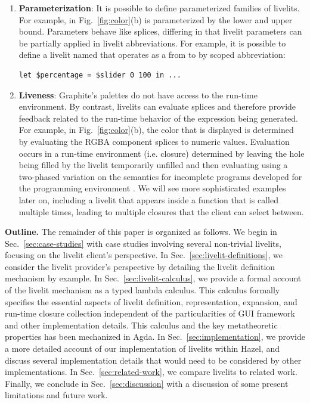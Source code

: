 \begin{enumerate}
  \item \textbf{Parameterization}: It is possible to define parameterized families of livelits.
  For example,  in Fig.~\ref{fig:color}(b) is parameterized by the lower and upper bound.
  Parameters behave like splices, differing in that livelit parameters can be partially applied in
  livelit abbreviations. For example, it is possible to define a livelit named 
  that operates as a  from  to  by scoped abbreviation:
  \begin{lstlisting}[numbers=none]
  let $percentage = $slider 0 100 in ...
  \end{lstlisting}

  \item \textbf{Liveness}: Graphite's palettes do not have
  access to the run-time environment. By contrast, livelits can evaluate splices
  and therefore provide feedback related to the run-time behavior of the expression being generated.
  For example, in Fig.~\ref{fig:color}(b), the color that is displayed is determined by evaluating the RGBA
  component splices to numeric values.
  Evaluation occurs in a run-time environment (i.e. closure) determined by
  leaving the hole being filled by the livelit temporarily unfilled and then evaluating
  using a two-phased variation on the semantics for incomplete programs developed for the \Hazel programming environment \cite{HazelnutLive}.
  We will see more sophisticated examples later on, including a livelit
  that appears inside a function that is called multiple times, leading to multiple closures that the client can
   select between.
\end{enumerate}

\noindent
\textbf{Outline.} The remainder of this paper is organized as follows. We begin in Sec.~\ref{sec:case-studies} with case studies
involving several non-trivial livelits, focusing on the livelit client's perspective.
In Sec.~\ref{sec:livelit-definitions}, we consider the livelit provider's perspective by detailing the livelit
definition mechanism by example.
In Sec.~\ref{sec:livelit-calculus}, we provide a formal account of the livelit mechanism as a typed lambda calculus.
This calculus formally specifies the essential aspects of livelit definition, representation, expansion,
and run-time closure collection independent of the particularities of GUI framework and other implementation details.
This calculus and the key metatheoretic properties has been mechanized in Agda.
In Sec.~\ref{sec:implementation}, we provide a more detailed account of our implementation of livelits within Hazel,
and discuss several implementation details that would need to be considered by other implementations.
In Sec.~\ref{sec:related-work}, we compare livelits to related work.
Finally, we conclude in Sec.~\ref{sec:discussion} with a discussion of some present limitations and future work.